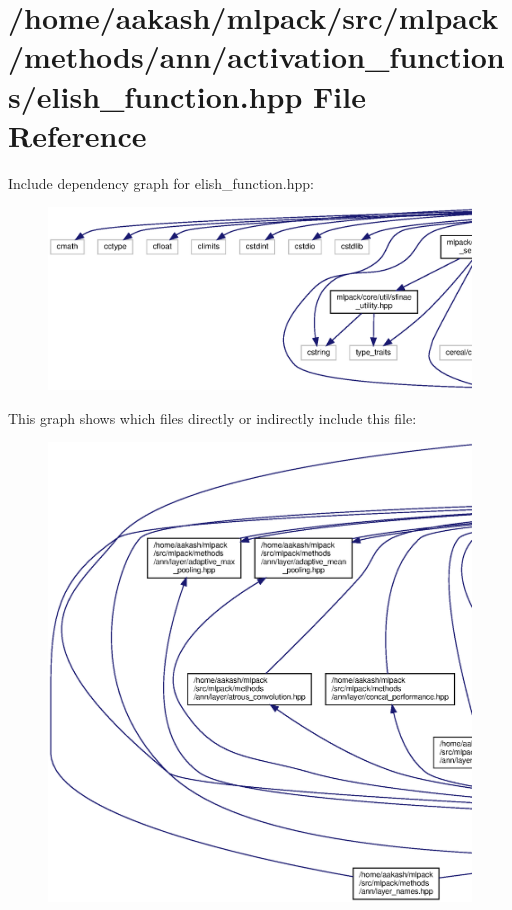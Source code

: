 \section{/home/aakash/mlpack/src/mlpack/methods/ann/activation\+\_\+functions/elish\+\_\+function.hpp File Reference}
\label{elish__function_8hpp}
Include dependency graph for elish\+\_\+function.\+hpp\+:
\nopagebreak
\begin{figure}[H]
\begin{center}
\leavevmode
\includegraphics[width=350pt]{elish__function_8hpp__incl}
\end{center}
\end{figure}
This graph shows which files directly or indirectly include this file\+:
\nopagebreak
\begin{figure}[H]
\begin{center}
\leavevmode
\includegraphics[width=350pt]{elish__function_8hpp__dep__incl}
\end{center}
\end{figure}
